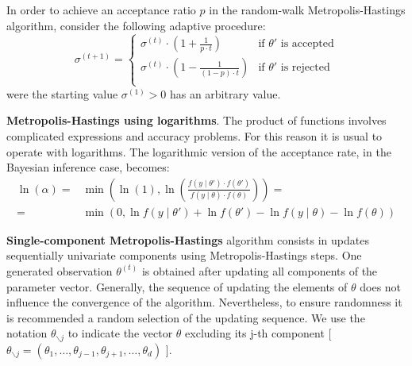 \documentclass[11pt,fleqn]{book} %
\begin{document}
\begin{proposition}
	In order to achieve an acceptance ratio $p$ in the random-walk 
	Metropolis-Hastings algorithm, consider the following adaptive
	procedure:
	\begin{displaymath}
		\sigma^{(t+1)} = \left\{
		\begin{array}{ll}
			\sigma^{(t)} \cdot \left( 1 + \frac{1}{p \cdot t} \right) & \text{if $\theta'$ is accepted} \\
			\sigma^{(t)} \cdot \left( 1 - \frac{1}{(1-p) \cdot t} \right) & \text{if $\theta'$ is rejected} \\
		\end{array}
		\right.
	\end{displaymath}
	were the starting value $\sigma^{(1)} > 0$ has an arbitrary value.
\end{proposition}

\textbf{Metropolis-Hastings using logarithms}.
The product of functions involves complicated expressions and accuracy 
problems. For this reason it is usual to operate with logarithms. The 
logarithmic version of the acceptance rate, in the Bayesian inference 
case, becomes:
\begin{displaymath}
	\begin{array}{rl}
		\ln(\alpha) = & \min \left( \ln(1),  
		\ln \left(\frac{f(y \mid \theta') \cdot f(\theta')}{f(y \mid \theta) \cdot f(\theta)}\right)
		\right) = \\
		= & \min \left( 0,
		\ln f(y \mid \theta') + \ln f(\theta') - \ln f(y \mid \theta) - \ln f(\theta)
		\right)
	\end{array}
\end{displaymath}

\textbf{Single-component Metropolis-Hastings} algorithm consists in updates 
sequentially univariate components using Metropolis-Hastings steps. 
One generated observation $\theta^{(t)}$ is obtained after updating all 
components of the parameter vector. Generally, the sequence of updating the 
elements of $\theta$ does not influence the convergence of the algorithm.
Nevertheless, to ensure randomness it is recommended a random selection of 
the updating sequence. We use the notation $\theta_{\backslash j}$ to indicate 
the vector $\theta$ excluding its j-th component [ $\theta_{\backslash j}
= (\theta_1,\dots,\theta_{j-1},\theta_{j+1},\dots,\theta_{d})$ ].
\end{document}
